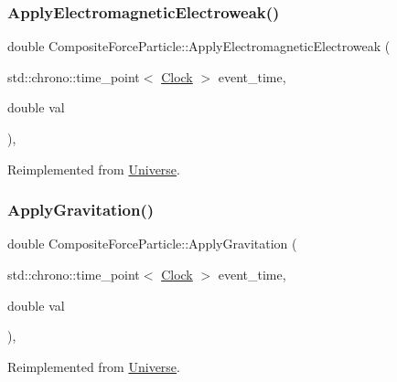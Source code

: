 \subsubsection{\texorpdfstring{Apply\+Electromagnetic\+Electroweak()}{ApplyElectromagneticElectroweak()}}
{\footnotesize\ttfamily double Composite\+Force\+Particle\+::\+Apply\+Electromagnetic\+Electroweak (\begin{DoxyParamCaption}\item[{std\+::chrono\+::time\+\_\+point$<$ \mbox{\hyperlink{universe_8h_a0ef8d951d1ca5ab3cfaf7ab4c7a6fd80}{Clock}} $>$}]{event\+\_\+time,  }\item[{double}]{val }\end{DoxyParamCaption})\hspace{0.3cm}{\ttfamily [inline]}, {\ttfamily [virtual]}}



Reimplemented from \mbox{\hyperlink{classUniverse_a4c36c1ab30db993307f88363dde5e8c5}{Universe}}.

\mbox{\label{classCompositeForceParticle_ae26a03c2970a3825e8583a811339b28d}} 
\subsubsection{\texorpdfstring{Apply\+Gravitation()}{ApplyGravitation()}}
{\footnotesize\ttfamily double Composite\+Force\+Particle\+::\+Apply\+Gravitation (\begin{DoxyParamCaption}\item[{std\+::chrono\+::time\+\_\+point$<$ \mbox{\hyperlink{universe_8h_a0ef8d951d1ca5ab3cfaf7ab4c7a6fd80}{Clock}} $>$}]{event\+\_\+time,  }\item[{double}]{val }\end{DoxyParamCaption})\hspace{0.3cm}{\ttfamily [inline]}, {\ttfamily [virtual]}}



Reimplemented from \mbox{\hyperlink{classUniverse_a76c0b5e63c2a7d1988c44db341c3d64c}{Universe}}.

\mbox{\label{classCompositeForceParticle_ac1464a04fbbca2d8927dfdbef0429878}} 
